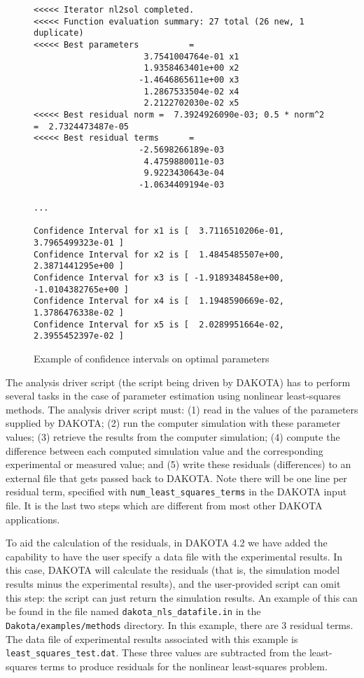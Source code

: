 \begin{figure}
\begin{bigbox}
\begin{small}
\begin{verbatim}
<<<<< Iterator nl2sol completed.
<<<<< Function evaluation summary: 27 total (26 new, 1 duplicate)
<<<<< Best parameters          =
                      3.7541004764e-01 x1
                      1.9358463401e+00 x2
                     -1.4646865611e+00 x3
                      1.2867533504e-02 x4
                      2.2122702030e-02 x5
<<<<< Best residual norm =  7.3924926090e-03; 0.5 * norm^2 =  2.7324473487e-05
<<<<< Best residual terms      =
                     -2.5698266189e-03
                      4.4759880011e-03
                      9.9223430643e-04
                     -1.0634409194e-03

...

Confidence Interval for x1 is [  3.7116510206e-01,  3.7965499323e-01 ]
Confidence Interval for x2 is [  1.4845485507e+00,  2.3871441295e+00 ]
Confidence Interval for x3 is [ -1.9189348458e+00, -1.0104382765e+00 ]
Confidence Interval for x4 is [  1.1948590669e-02,  1.3786476338e-02 ]
Confidence Interval for x5 is [  2.0289951664e-02,  2.3955452397e-02 ]

\end{verbatim}
\end{small}
\end{bigbox}
\caption{Example of confidence intervals on optimal parameters}
\label{nls:figure02}
\end{figure}

The analysis driver script (the script being driven by DAKOTA) 
has to perform several tasks in the case of parameter estimation 
using nonlinear least-squares methods.  The analysis driver script 
must: (1) read in the values of the parameters supplied by DAKOTA;
(2) run the computer simulation with these parameter values;
(3) retrieve the results from the computer simulation;
(4) compute the difference between each computed simulation value
and the corresponding experimental or measured value; and 
(5) write these residuals (differences)
to an external file that gets passed back to DAKOTA.  Note there 
will be one line per residual term, specified with 
\texttt{num\_least\_squares\_terms}
in the DAKOTA input file.   It is the last two steps which are different from 
most other DAKOTA applications.  

To aid the calculation of the residuals, in DAKOTA 4.2
we have added the capability to have the user specify a 
data file with the experimental results.  In this case, DAKOTA
will calculate the residuals 
(that is, the simulation model results minus the experimental results),
and the user-provided script can omit this step:
the script can just return the simulation results. 
An example of this can be found in the file named   
\texttt{dakota\_nls\_datafile.in} in the \texttt{Dakota/examples/methods} 
directory.  In this example, there are 3 residual terms.  
The data file of experimental results associated with this example
is \texttt{least\_squares\_test.dat}.  These three values are subtracted 
from the least-squares terms to produce residuals for the nonlinear 
least-squares problem. 


